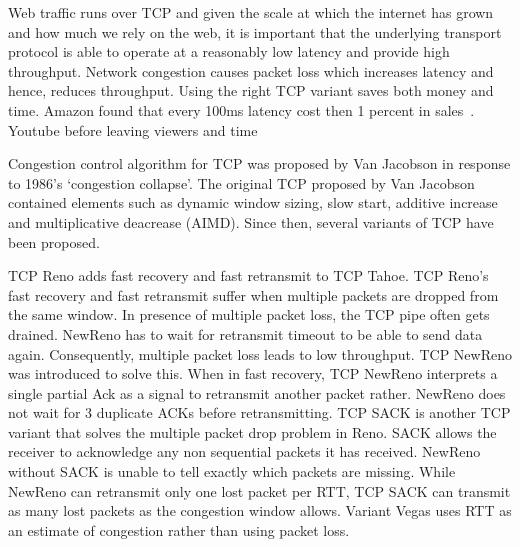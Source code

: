  Web traffic runs over TCP and given the scale at which the internet has grown and how much we rely on the web, it is important that the underlying transport protocol is able to operate at a reasonably low latency and provide high throughput. Network congestion causes packet loss which increases latency and hence, reduces throughput. Using the right TCP variant saves both money and time. Amazon found that every 100ms latency cost then 1 percent in sales~\cite{kohavi_online_2007}. Youtube before leaving viewers and time
 
 
 Congestion control algorithm for TCP was proposed by Van Jacobson  in response to 1986's `congestion collapse'. The original TCP proposed by Van Jacobson contained elements such as dynamic window sizing, slow start, additive increase and multiplicative deacrease (AIMD). Since then, several variants of TCP have been proposed. 
 
 TCP Reno adds fast recovery and fast retransmit to TCP Tahoe. TCP Reno's fast recovery and fast retransmit suffer when multiple packets are dropped from the same window. In presence of multiple packet loss, the TCP pipe often gets drained. NewReno has to wait for retransmit timeout to be able to send data again. Consequently, multiple packet loss leads to low throughput. TCP NewReno was introduced to solve this. When in fast recovery, TCP NewReno interprets a single partial Ack as a signal to retransmit another packet rather. NewReno does not wait for 3 duplicate ACKs before retransmitting. TCP SACK is another TCP variant that solves the multiple packet drop problem in Reno. SACK allows the receiver to acknowledge any non sequential packets it has received. NewReno  without SACK is unable to tell exactly which packets are missing. While NewReno can retransmit only one lost packet per RTT, TCP SACK can transmit as many lost packets as the congestion window allows. Variant Vegas uses RTT as an estimate of congestion rather than using packet loss.  
